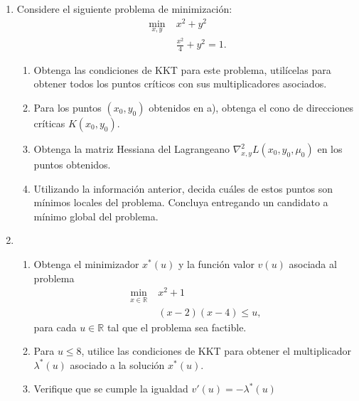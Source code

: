 \documentclass{article}
\begin{document}
\begin{enumerate}
\begin{enumerate}
		\end{enumerate}
	\item Considere el siguiente problema de minimización:
		\begin{align*}
			\min_{x, y} \; & x^2 + y^2 \\
				       & \frac{x^2}{4} + y^2 = 1.
		\end{align*}
		\begin{enumerate}
			\item Obtenga las condiciones de KKT para este problema, utilícelas para obtener todos los puntos críticos con sus multiplicadores asociados.
			\item Para los puntos \((x_0, y_0)\) obtenidos en a), obtenga el cono de direcciones críticas \(K(x_0, y_0)\).
			\item Obtenga la matriz Hessiana del Lagrangeano \(\nabla_{x, y}^2 L(x_0, y_0, \mu_0)\) en los puntos obtenidos.
			\item Utilizando la información anterior, decida cuáles de estos puntos son mínimos locales del problema. Concluya entregando un candidato a mínimo global del problema.
		\end{enumerate}
	\item 
		\begin{enumerate}
			\item Obtenga el minimizador \(x^*(u)\) y la función valor \(v(u)\) asociada al problema
				\begin{align*}
					\min_{x \in \mathbb{R}}\; & x^2 + 1 \\
								  & (x - 2)(x - 4) \leq u,
				\end{align*}
				para cada \(u \in \mathbb{R}\) tal que el problema sea factible.
			\item Para \(u \leq 8\), utilice las condiciones de KKT para obtener el multiplicador \(\lambda^*(u)\) asociado a la solución \(x^*(u)\).
			\item Verifique que se cumple la igualdad \(v'(u) = -\lambda^*(u)\)
		\end{enumerate}
\end{enumerate}
\end{document}
